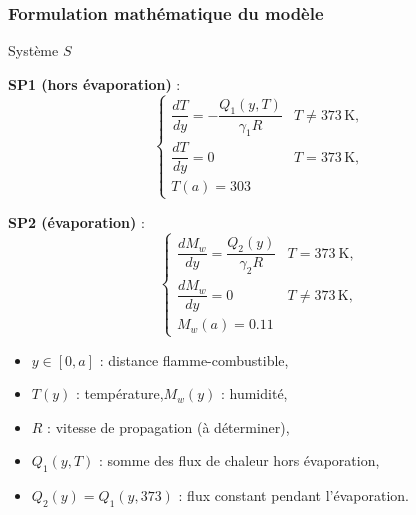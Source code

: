 \documentclass[handout]{beamer}
\newtheorem{pbm et hypo}[thm]{Problématique et hypothèses}
\begin{document}
	\begin{frame}
		\frametitle{\textbf{Formulation mathématique du modèle}}
		
\begin{block}{Système $S$} \pause
			\begin{minipage}{0.48\linewidth}
			\textbf{SP1 (hors évaporation)} :
			\begin{equation*}
				\begin{cases}
					\dfrac{dT}{dy} = -\dfrac{Q_1(y,T)}{\gamma_1 R} & T \neq 373\, \mathrm{K},  \\[0.4em]
					\dfrac{dT}{dy} = 0 & T = 373\, \mathrm{K},  \\[0.4em]
					T(a) = 303
				\end{cases}
			\end{equation*}
		\end{minipage}\pause
		\hfill
		\begin{minipage}{0.48\linewidth}
			\textbf{SP2 (évaporation)} :
			\begin{equation*}
				\begin{cases}
					\dfrac{dM_w}{dy} = \dfrac{Q_2(y)}{\gamma_2 R} & T = 373\ \mathrm{K}, \\[0.4em]
					\dfrac{dM_w}{dy} = 0 & T \neq 373\, \mathrm{K},  \\[0.4em]
					M_w(a) = 0.11
				\end{cases}
			\end{equation*}
		\end{minipage}\pause
\end{block}
		\pause
		\begin{itemize}
		\item $y \in [0,a]$ : distance flamme-combustible, 
		\item $T(y)$ : température,\quad $M_w(y)$ : humidité, 
		\item $R$ : vitesse de propagation (à déterminer), 
		\item $Q_1(y,T)$ : somme des flux de chaleur hors évaporation,
		\item $Q_2(y) = Q_1(y, 373)$ : flux constant pendant l'évaporation.
	\end{itemize} 
	\end{frame}	
	
\end{document}
